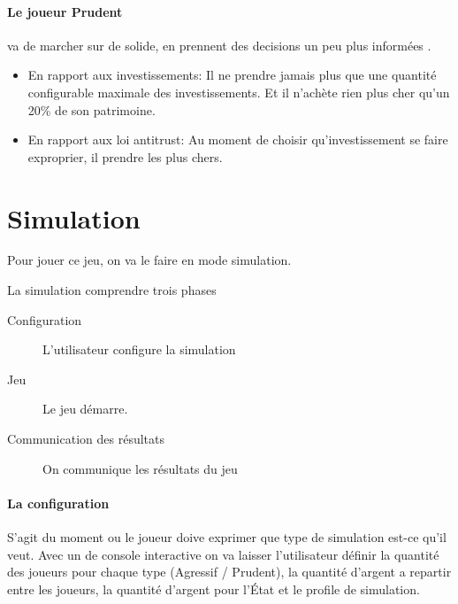 \documentclass[12pt]{article}
\begin{document}
  
   \paragraph {Le joueur Prudent}  va de marcher sur de solide, en prennent des decisions un peu plus informées . 
    \begin{itemize}
   	\item En rapport aux investissements: Il ne prendre jamais plus que une quantité configurable maximale des investissements.  Et il n'achète rien plus cher qu'un 20\% de son patrimoine. 
	\item En rapport aux loi antitrust: Au moment de choisir qu'investissement se faire exproprier, il prendre les plus chers.
   \end{itemize}




\section{Simulation}

 Pour jouer ce jeu, on va le faire en mode simulation.
 
 La simulation comprendre trois phases
 
 \begin{description} 
 	\item [Configuration] L'utilisateur configure la simulation
	\item [Jeu] Le jeu démarre. 
	\item [Communication des résultats] On communique les résultats du jeu  
\end{description}
 
 
 \paragraph{La configuration} S'agit du moment ou le joueur doive exprimer que type de simulation est-ce qu'il veut. 
	Avec un de console interactive on va laisser  l'utilisateur définir la quantité des joueurs pour chaque type (Agressif / Prudent), la quantité d'argent a repartir entre les joueurs, la quantité d'argent pour l'État et le profile de simulation. 
 
\end{document}
